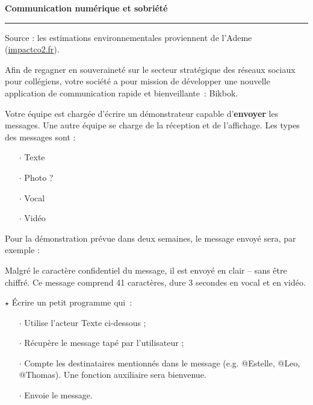 
\begin{center}
  \Large\bf Communication numérique et sobriété
\end{center}

\noindent\rule{\linewidth}{.6pt}

\bigskip

Source : les estimations environnementales proviennent de l'Ademe (\url{impactco2.fr}).


Afin de regagner en souveraineté sur le secteur stratégique des réseaux sociaux pour collégiens, votre société a pour mission de développer une nouvelle application de communication rapide et bienveillante~: Bikbok.

Votre équipe est chargée d'écrire un démonstrateur capable d'\textbf{envoyer} les messages. Une autre équipe se charge de la réception et de l'affichage. Les types des messages sont :

\begin{itemize}[itemsep=0.2ex]
\item[$\cdot$] Texte
\item[$\cdot$] Photo ?
\item[$\cdot$] Vocal
\item[$\cdot$] Vidéo
\end{itemize}

Pour la démonstration prévue dans deux semaines, le message envoyé sera, par exemple :

\smallskip
\centerline{}
\smallskip

Malgré le caractère confidentiel du message, il est envoyé en clair -- sans être chiffré. Ce message comprend 41 caractères, dure 3 secondes en vocal et en vidéo.


$\star$ Écrire un petit programme qui~:

\begin{itemize}[itemsep=0.2ex]
\item[$\cdot$] Utilise l'acteur Texte ci-dessous ;
\item[$\cdot$] Récupère le message tapé par l'utilisateur ;
\item[$\cdot$] Compte les destinataires mentionnés dans le message (e.g. @Estelle, @Leo, @Thomas). Une fonction auxiliaire sera bienvenue.
\item[$\cdot$] Envoie le message.
\end{itemize}

